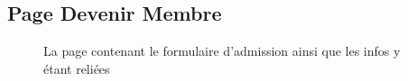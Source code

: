 \documentclass{article}[12pt]
\begin{document}
     \subsection{Page Devenir Membre}
    \begin{figure}[H]
     	\centering
     	\caption{La page contenant le formulaire d'admission ainsi que les infos y étant reliées}
     \end{figure}
\end{document}

